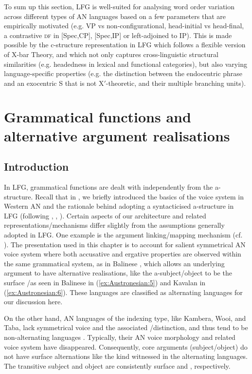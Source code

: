 \documentclass[output=paper,chinesefont]{../langscibook}
\begin{document}
To sum up this section, LFG is well-suited for analysing word order variation across different types of AN languages based on a few parameters that are empirically motivated (e.g. VP vs non-configurational, head-initial vs head-final, a contrastive \textsc{df} in [Spec,CP], [Spec,IP] or left-adjoined to IP). This is made possible by the c-structure representation in LFG which follows a flexible version of X-bar Theory, and which not only captures cross-linguistic structural similarities (e.g. headedness in lexical and functional categories), but also varying language-specific properties (e.g. the distinction between the endocentric phrase and an exocentric S that is not X$'$-theoretic, and their multiple branching units). 

\section{Grammatical functions and alternative argument realisations }
\label{sec:Austronesian:4}
\subsection{Introduction}
In LFG, grammatical functions are dealt with independently from the a-structure. Recall that in , we briefly introduced the basics of the voice system in Western AN and the rationale behind adopting a syntacticised a-structure in LFG (following \citealt{Manning1994}, \citealt{arka2003}, \citealt{Arka2008}). Certain aspects of our architecture and related representations/mechanisms differ slightly from the assumptions generally adopted in LFG. One example is the argument linking/mapping mechanism (cf. ). The presentation used in this chapter is to account for salient symmetrical AN voice system where both accusative and ergative properties are observed within the same grammatical system, as in Balinese \citep{arka2003}, which allows an underlying argument to have alternative \GF realisations, like the a-subject/object to be the surface \OBJ/\SUBJ as seen in Balinese in (\ref{ex:Austronesian:5}) and Kavalan in (\ref{ex:Austronesian:6}). These languages are classified as alternating languages for our discussion here.

On the other hand, AN languages of the indexing type, like Kambera, Wooi, and Taba, lack symmetrical voice and the associated \SUBJ/\PIVOT distinction, and thus tend to be non-alternating languages \citep{Klamer1996,Bowden2001,Sawaki2016}. Typically, their AN voice morphology and related voice system have disappeared. Consequently, core arguments (subject/object) do not have surface \GF alternations like the kind witnessed in the alternating languages. The transitive subject and object are consistently surface \SUBJ and \OBJ, respectively.
\end{document}
